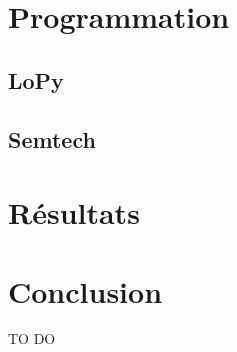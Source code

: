 \documentclass[11pt]{article}
\begin{document}
\section{Programmation}

\subsection{LoPy}
\subsection{Semtech}
\newpage
\section{Résultats}
\newpage
\section{Conclusion}
TO DO 
\newpage
\listoffigures
\newpage
\listofalgorithms
{}
\newpage
\end{document}
